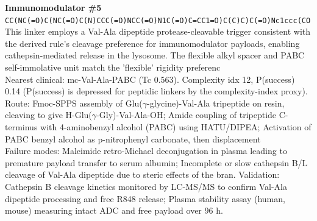 \documentclass[10pt]{article}
\begin{document}
\noindent\textbf{Immunomodulator \#5} \\ \texttt{CC(NC(=O)C(NC(=O)C(N)CCC(=O)NCC(=O)N1C(=O)C=CC1=O)C(C)C)C(=O)Nc1ccc(CO} \\ This linker employs a Val-Ala dipeptide protease-cleavable trigger consistent with the derived rule's cleavage preference for immunomodulator payloads, enabling cathepsin-mediated release in the lysosome. The flexible alkyl spacer and PABC self-immolative unit match the 'flexible' rigidity preferenc \\ Nearest clinical: mc-Val-Ala-PABC (Tc 0.563). Complexity idx 12, P(success) 0.14 (P(success) is depressed for peptidic linkers by the complexity-index proxy). \\ Route: Fmoc-SPPS assembly of Glu($\gamma$-glycine)-Val-Ala tripeptide on resin, cleaving to give H-Glu($\gamma$-Gly)-Val-Ala-OH; Amide coupling of tripeptide C-terminus with 4-aminobenzyl alcohol (PABC) using HATU/DIPEA; Activation of PABC benzyl alcohol as p-nitrophenyl carbonate, then displacement  \\ Failure modes: Maleimide retro-Michael deconjugation in plasma leading to premature payload transfer to serum albumin; Incomplete or slow cathepsin B/L cleavage of Val-Ala dipeptide due to steric effects of the bran. Validation: Cathepsin B cleavage kinetics monitored by LC-MS/MS to confirm Val-Ala dipeptide processing and free R848 release; Plasma stability assay (human, mouse) measuring intact ADC and free payload over 96 h. \\[0.4em]
\end{document}
